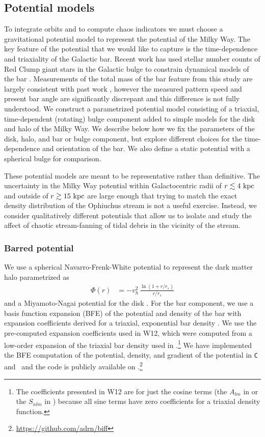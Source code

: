 \subsection{Potential models}\label{sec:ch5-potential}
To integrate orbits and to compute chaos indicators we must choose a
gravitational potential model to represent the potential of the Milky Way. The
key feature of the potential that we would like to capture is the
time-dependence and triaxiality of the Galactic bar. Recent work has used
stellar number counts of Red Clump giant stars in the Galactic bulge to
constrain dynamical models of the bar \citep{portail15}. Measurements of the
total mass of the bar feature from this study are largely consistent with past
work \citep[e.g.,][]{wang12}, however the measured pattern speed and present bar
angle are significantly discrepant and this difference is not fully understood.
We construct a parametrized potential model consisting of a triaxial,
time-dependent (rotating) bulge component added to simple models for the disk
and halo of the Milky Way. We describe below how we fix the parameters of the
disk, halo, and bar or bulge component, but explore different choices for the
time-dependence and orientation of the bar. We also define a static potential
with a spherical bulge for comparison.

These potential models are meant to be representative rather than definitive.
The uncertainty in the Milky Way potential within Galactocentric radii of
$r\lesssim 4~{\rm kpc}$ and outside of $r\gtrsim 15~{\rm kpc}$ are large enough
that trying to match the exact density distribution of the Ophiuchus stream is
not a useful exercise. Instead, we consider qualitatively different potentials
that allow us to isolate and study the affect of chaotic stream-fanning of tidal
debris in the vicinity of the stream.

\subsubsection{Barred potential}
We use a spherical Navarro-Frenk-White potential to represent the dark matter
halo \citep{navarro96} parametrized as
\begin{align}
	\Phi(r) &= -v_h^2\,\frac{\ln{(1 + r/r_s)}}{r/r_s}\label{eq:nfw}
\end{align}
and a Miyamoto-Nagai potential for the disk \citep{miyamoto75}. For the bar
component, we use a basis function expansion (BFE) of the potential and density
of the bar with expansion coefficients derived for a triaxial, exponential bar
density \citep[][hereafter W12]{wang12}. We use the pre-computed expansion
coefficients used in W12, which were computed from a low-order expansion of the
triaxial bar density used in \citet{dwek95}.\footnote{The coefficients presented
in W12 are for just the cosine terms (the $A_{lm}$ in \citet{hernquist92} or the
$S_{nlm}$ in \citet{lowing11}) because all sine terms have zero coefficients for
a triaxial density function.} We have implemented the BFE computation of the
potential, density, and gradient of the potential in \texttt{C} and \python\ and
the code is publicly available on
\github.\footnote{\url{https://github.com/adrn/biff}}

